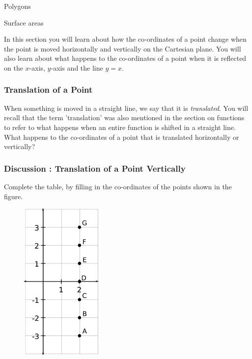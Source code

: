 \begin{exercises}{Polygons}
\begin{exercises}{Surface areas }
      
      \label{m39358*id70076}In this section you will learn about how the co-ordinates of a point change when the point is moved horizontally and vertically on the Cartesian plane. You will also learn about what happens to the co-ordinates of a point when it is reflected on the $x$-axis, $y$-axis and the line $y=x$.\par 
      \label{m39358*uid569}
            \subsubsection{ Translation of a Point}
            \nopagebreak
            
        
        \label{m39358*id70123}When something is moved in a straight line, we say that it is \textsl{translated}. You will recall that the term 'translation' was also mentioned in the section on functions to refer to what happens when an entire function is shifted in a straight line. What happens to the co-ordinates of a point that is translated horizontally or vertically?\par 
\label{m39358*secfhsst!!!underscore!!!id2414}
            \subsubsection{  Discussion : Translation of a Point Vertically }
            \nopagebreak
            
        \label{m39358*id70140}Complete the table, by filling in the co-ordinates of the points shown in the figure.\par 
        \label{m39358*id70146}
          
    \setcounter{subfigure}{0}


	\begin{figure}[H] %
    \begin{center}
    \label{m39358*id70150!!!underscore!!!media}\label{m39358*id70150!!!underscore!!!printimage}\includegraphics[height=300px]{col11306.imgs/m39358_MG10C14_022.png} %
        

\end{center}
\end{figure}
\end{exercises}
\end{exercises}
